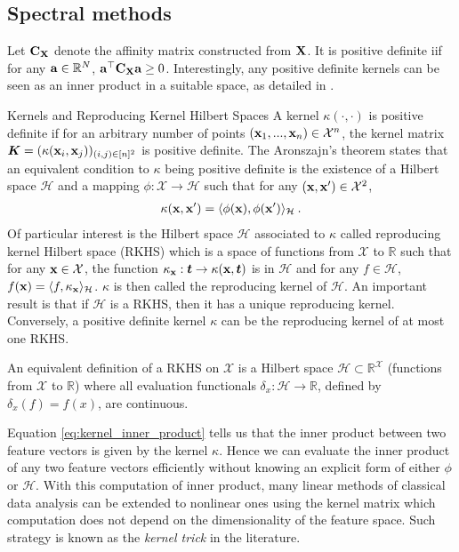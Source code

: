 \subsection{Spectral methods}


Let ${\mathbf{C}}_{{\mathbf{X}}}$ denote the affinity matrix constructed from ${\mathbf{X}}$. It is positive definite iif for any ${\mathbf{a}} \in \mathbb{R}^N$, ${\mathbf{a}}^\top {\mathbf{C}}_{{\mathbf{X}}} {\mathbf{a}} \geq 0$.
Interestingly, any positive definite kernels can be seen as an inner product in a suitable space, as detailed in .

\begin{rem1}{Kernels and Reproducing Kernel Hilbert Spaces}\label{rem:kernels}
	A kernel $\kappa(\cdot, \cdot)$ is positive definite if for an arbitrary number of points $({\mathbf{x}}_1, ..., {\mathbf{x}}_n) \in \mathcal{X}^n$, the kernel matrix $\bm{K} = (\kappa({\mathbf{x}}_i, {\mathbf{x}}_j))_{(i,j) \in [n]^2}$ is positive definite. The Aronszajn's theorem \citep{aronszajn1950theory} states that an equivalent condition to $\kappa$ being positive definite is the existence of a Hilbert space $\mathcal{H}$ and a mapping $\phi : \mathcal{X} \to \mathcal{H}$ such that for any $({\mathbf{x}}, {\mathbf{x}}') \in \mathcal{X}^2$,
\begin{align}\label{eq:kernel_inner_product}
    \kappa({\mathbf{x}}, {\mathbf{x}}') = \langle \phi({\mathbf{x}}), \phi({\mathbf{x}}') \rangle_{\mathcal{H}} \:.
\end{align}
Of particular interest is the Hilbert space $\mathcal{H}$ associated to $\kappa$ called reproducing kernel Hilbert space (RKHS) which is a space of functions from $\mathcal{X}$ to $\mathbb{R}$ such that for any ${\mathbf{x}} \in \mathcal{X}$, the function $\kappa_{{\mathbf{x}}} : \bm{t} \to \kappa({\mathbf{x}}, \bm{t})$ is in $\mathcal{H}$ and for any $f \in \mathcal{H}$, $f({\mathbf{x}}) = \langle f, \kappa_{{\mathbf{x}}} \rangle_{\mathcal{H}}$. $\kappa$ is then called the reproducing kernel of $\mathcal{H}$. An important result is that if $\mathcal{H}$ is a RKHS, then it has a unique reproducing kernel. Conversely, a positive definite kernel $\kappa$ can be the reproducing kernel of at most one RKHS.


An equivalent definition of a RKHS on $\mathcal{X}$ is a Hilbert
space $\mathcal{H} \subset \mathbb{R}^{\mathcal{X}}$ (functions from $\mathcal{X}$ to $\mathbb{R}$) where all evaluation functionals $\delta_x : \mathcal{H} \to \mathbb{R}$,
defined by $\delta_x(f) = f(x)$, are continuous.

Equation \ref{eq:kernel_inner_product} tells us that the inner product between two feature vectors is given by the kernel $\kappa$. Hence we can evaluate the inner product of any two feature vectors efficiently without knowing an explicit form of either $\phi$ or $\mathcal{H}$. With this computation of inner product, many linear methods of classical data analysis can be extended to nonlinear ones using the kernel matrix which computation does not depend on the dimensionality of the feature space. Such strategy is known as the \textit{kernel trick} in the literature.
\end{rem1}


